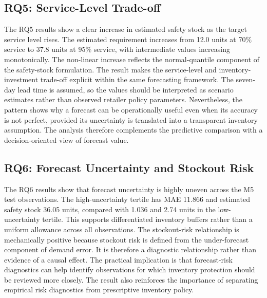 \subsection{RQ5: Service-Level Trade-off}
The RQ5 results show a clear increase in estimated safety stock as the target service level rises.
The estimated requirement increases from 12.0 units at 70\% service to 37.8 units at 95\% service, with intermediate values increasing monotonically.
The non-linear increase reflects the normal-quantile component of the safety-stock formulation.
The result makes the service-level and inventory-investment trade-off explicit within the same forecasting framework.
The seven-day lead time is assumed, so the values should be interpreted as scenario estimates rather than observed retailer policy parameters.
Nevertheless, the pattern shows why a forecast can be operationally useful even when its accuracy is not perfect, provided its uncertainty is translated into a transparent inventory assumption.
The analysis therefore complements the predictive comparison with a decision-oriented view of forecast value.

\subsection{RQ6: Forecast Uncertainty and Stockout Risk}
The RQ6 results show that forecast uncertainty is highly uneven across the M5 test observations.
The high-uncertainty tertile has MAE 11.866 and estimated safety stock 36.05 units, compared with 1.036 and 2.74 units in the low-uncertainty tertile.
This supports differentiated inventory buffers rather than a uniform allowance across all observations.
The stockout-risk relationship is mechanically positive because stockout risk is defined from the under-forecast component of demand error.
It is therefore a diagnostic relationship rather than evidence of a causal effect.
The practical implication is that forecast-risk diagnostics can help identify observations for which inventory protection should be reviewed more closely.
The result also reinforces the importance of separating empirical risk diagnostics from prescriptive inventory policy.


